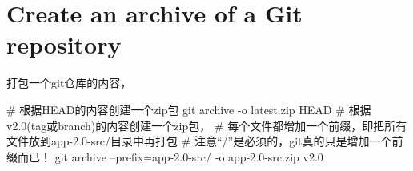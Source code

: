 \section[Git archive]{Create an archive of a Git repository}
打包一个git仓库的内容，

\begin{bashcode}
# 根据HEAD的内容创建一个zip包
git archive -o latest.zip HEAD
# 根据v2.0(tag或branch)的内容创建一个zip包，
# 每个文件都增加一个前缀，即把所有文件放到app-2.0-src/目录中再打包
# 注意“/”是必须的，git真的只是增加一个前缀而已！
git archive --prefix=app-2.0-src/ -o app-2.0-src.zip v2.0
\end{bashcode}